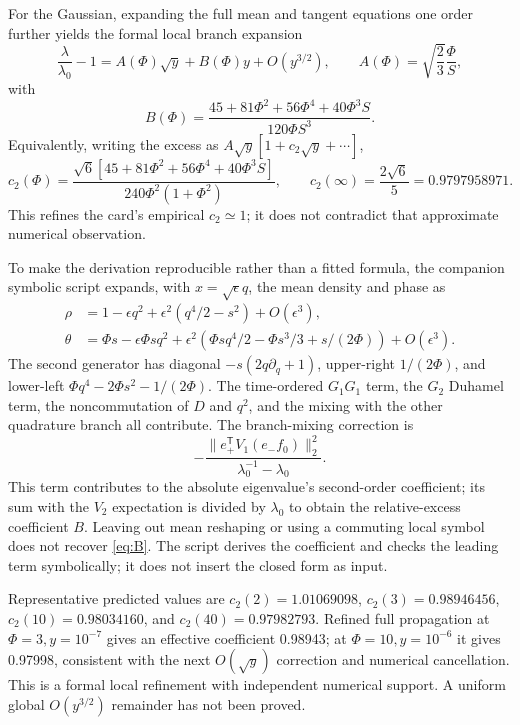 \documentclass[11pt,a4paper]{article}
\newcommand{\lzero}{\lambda_0}
\begin{document}
For the Gaussian, expanding the full mean and tangent equations one order further yields the formal local branch expansion
\begin{equation}\label{eq:Bexp}
\frac{\lambda}{\lzero}-1=A(\Phi)\sqrt y+B(\Phi)y+O(y^{3/2}),\qquad
A(\Phi)=\sqrt{\frac23}\frac{\Phi}{S},
\end{equation}
with
\begin{equation}\label{eq:B}
\boxed{B(\Phi)=\frac{45+81\Phi^2+56\Phi^4+40\Phi^3S}{120\Phi S^3}.}
\end{equation}
Equivalently, writing the excess as $A\sqrt y[1+c_2\sqrt y+\cdots]$,
\begin{equation}\label{eq:c2}
\boxed{c_2(\Phi)=\frac{\sqrt6[45+81\Phi^2+56\Phi^4+40\Phi^3S]}{240\Phi^2(1+\Phi^2)},\qquad
c_2(\infty)=\frac{2\sqrt6}{5}=0.9797958971.}
\end{equation}
This refines the card's empirical $c_2\simeq1$; it does not contradict that approximate numerical observation.

To make the derivation reproducible rather than a fitted formula, the companion symbolic script expands, with $x=\sqrt\epsilon q$, the mean density and phase as
\begin{align}
\rho&=1-\epsilon q^2+\epsilon^2(q^4/2-s^2)+O(\epsilon^3),\\
\theta&=\Phi s-\epsilon\Phi s q^2
+\epsilon^2(\Phi s q^4/2-\Phi s^3/3+s/(2\Phi))+O(\epsilon^3).
\end{align}
The second generator has diagonal $-s(2q\partial_q+1)$, upper-right $1/(2\Phi)$, and lower-left $\Phi q^4-2\Phi s^2-1/(2\Phi)$. The time-ordered $G_1G_1$ term, the $G_2$ Duhamel term, the noncommutation of $D$ and $q^2$, and the mixing with the other quadrature branch all contribute. The branch-mixing correction is
\begin{equation}
-\frac{\|e_+^{\mathsf T}V_1(e_-f_0)\|_2^2}{\lzero^{-1}-\lzero}.
\end{equation}
This term contributes to the absolute eigenvalue's second-order coefficient; its sum with the $V_2$ expectation is divided by $\lzero$ to obtain the relative-excess coefficient $B$. Leaving out mean reshaping or using a commuting local symbol does not recover \eqref{eq:B}. The script derives the coefficient and checks the leading term symbolically; it does not insert the closed form as input.

Representative predicted values are $c_2(2)=1.01069098$, $c_2(3)=0.98946456$, $c_2(10)=0.98034160$, and $c_2(40)=0.97982793$. Refined full propagation at $\Phi=3,y=10^{-7}$ gives an effective coefficient 0.98943; at $\Phi=10,y=10^{-6}$ it gives 0.97998, consistent with the next $O(\sqrt y)$ correction and numerical cancellation. This is a formal local refinement with independent numerical support. A uniform global $O(y^{3/2})$ remainder has not been proved.
\end{document}
